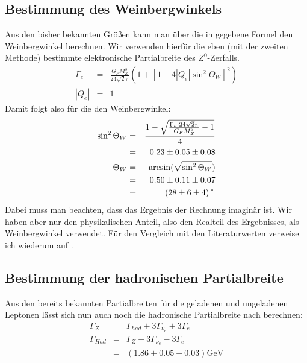 \subsection{Bestimmung des Weinbergwinkels}
Aus den bisher bekannten Größen kann man über die in \cite[Gl.6]{script} gegebene Formel den Weinbergwinkel berechnen. Wir verwenden hierfür die eben (mit der zweiten Methode) bestimmte elektronische Partialbreite des $Z^0$-Zerfalls.
\begin{eqnarray}
\Gamma_e &=& \frac{G_F M_Z^3}{24 \sqrt{2}\pi}\left(1+[1-4|Q_e|\sin^2\Theta_W]^2\right)\\
|Q_e| &=& 1
\end{eqnarray}
Damit folgt also für die den Weinbergwinkel:
\begin{eqnarray}
\sin^2\Theta_W &=& \frac{1-\sqrt{\frac{\Gamma_e\cdot 24\sqrt{2}\pi}{G_FM_Z^3}-1}}{4}\\
&=& 0.23 \pm 0.05 \pm 0.08\\
\Theta_W &=& \arcsin(\sqrt{\sin^2\Theta_W})\\
&=& 0.50 \pm 0.11 \pm 0.07\\
&=& (28 \pm 6 \pm 4)\symbol{23}
\end{eqnarray}
Dabei muss man beachten, dass das Ergebnis der Rechnung imaginär ist. Wir haben aber nur den physikalischen Anteil, also den Realteil des Ergebnisses, als Weinbergwinkel verwendet. Für den Vergleich mit den Literaturwerten verweise ich wiederum auf \cite[Kap. 5]{kap5}.

\subsection{Bestimmung der hadronischen Partialbreite}
Aus den bereits bekannten Partialbreiten für die geladenen und ungeladenen Leptonen lässt sich nun auch noch die hadronische Partialbreite nach \cite[Gl.8]{script} berechnen:
\begin{eqnarray}
\Gamma_Z &=& \Gamma_{had} + 3\Gamma_{\nu_e} + 3\Gamma_e\\
\Gamma_{Had} &=& \Gamma_Z - 3\Gamma_{\nu_e} - 3\Gamma_e\\
&=& (1.86 \pm 0.05 \pm 0.03)\si{\giga\electronvolt}
\end{eqnarray}

